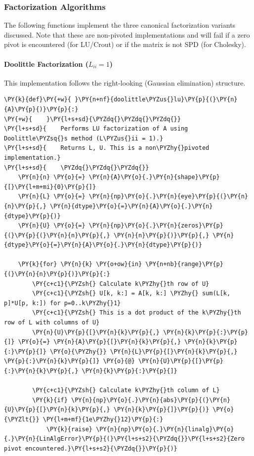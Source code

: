 \subsubsection*{Factorization Algorithms}
The following functions implement the three canonical factorization variants discussed. Note that these are non-pivoted implementations and will fail if a zero pivot is encountered (for LU/Crout) or if the matrix is not SPD (for Cholesky).

\paragraph{Doolittle Factorization ($L_{ii} = 1$)}
This implementation follows the right-looking (Gaussian elimination) structure.

\begin{Verbatim}[commandchars=\\\{\}]
\PY{k}{def}\PY{+w}{ }\PY{n+nf}{doolittle\PYZus{}lu}\PY{p}{(}\PY{n}{A}\PY{p}{)}\PY{p}{:}
\PY{+w}{    }\PY{l+s+sd}{\PYZdq{}\PYZdq{}\PYZdq{}}
\PY{l+s+sd}{    Performs LU factorization of A using Doolittle\PYZsq{}s method (L\PYZus{}ii = 1).}
\PY{l+s+sd}{    Returns L, U. This is a non\PYZhy{}pivoted implementation.}
\PY{l+s+sd}{    \PYZdq{}\PYZdq{}\PYZdq{}}
    \PY{n}{n} \PY{o}{=} \PY{n}{A}\PY{o}{.}\PY{n}{shape}\PY{p}{[}\PY{l+m+mi}{0}\PY{p}{]}
    \PY{n}{L} \PY{o}{=} \PY{n}{np}\PY{o}{.}\PY{n}{eye}\PY{p}{(}\PY{n}{n}\PY{p}{,} \PY{n}{dtype}\PY{o}{=}\PY{n}{A}\PY{o}{.}\PY{n}{dtype}\PY{p}{)}
    \PY{n}{U} \PY{o}{=} \PY{n}{np}\PY{o}{.}\PY{n}{zeros}\PY{p}{(}\PY{p}{(}\PY{n}{n}\PY{p}{,} \PY{n}{n}\PY{p}{)}\PY{p}{,} \PY{n}{dtype}\PY{o}{=}\PY{n}{A}\PY{o}{.}\PY{n}{dtype}\PY{p}{)}

    \PY{k}{for} \PY{n}{k} \PY{o+ow}{in} \PY{n+nb}{range}\PY{p}{(}\PY{n}{n}\PY{p}{)}\PY{p}{:}
        \PY{c+c1}{\PYZsh{} Calculate k\PYZhy{}th row of U}
        \PY{c+c1}{\PYZsh{} U[k, k:] = A[k, k:] \PYZhy{} sum(L[k, p]*U[p, k:]) for p=0..k\PYZhy{}1}
        \PY{c+c1}{\PYZsh{} This is a dot product of the k\PYZhy{}th row of L with columns of U}
        \PY{n}{U}\PY{p}{[}\PY{n}{k}\PY{p}{,} \PY{n}{k}\PY{p}{:}\PY{p}{]} \PY{o}{=} \PY{n}{A}\PY{p}{[}\PY{n}{k}\PY{p}{,} \PY{n}{k}\PY{p}{:}\PY{p}{]} \PY{o}{\PYZhy{}} \PY{n}{L}\PY{p}{[}\PY{n}{k}\PY{p}{,} \PY{p}{:}\PY{n}{k}\PY{p}{]} \PY{o}{@} \PY{n}{U}\PY{p}{[}\PY{p}{:}\PY{n}{k}\PY{p}{,} \PY{n}{k}\PY{p}{:}\PY{p}{]}

        \PY{c+c1}{\PYZsh{} Calculate k\PYZhy{}th column of L}
        \PY{k}{if} \PY{n}{np}\PY{o}{.}\PY{n}{abs}\PY{p}{(}\PY{n}{U}\PY{p}{[}\PY{n}{k}\PY{p}{,} \PY{n}{k}\PY{p}{]}\PY{p}{)} \PY{o}{\PYZlt{}} \PY{l+m+mf}{1e\PYZhy{}12}\PY{p}{:}
            \PY{k}{raise} \PY{n}{np}\PY{o}{.}\PY{n}{linalg}\PY{o}{.}\PY{n}{LinAlgError}\PY{p}{(}\PY{l+s+s2}{\PYZdq{}}\PY{l+s+s2}{Zero pivot encountered.}\PY{l+s+s2}{\PYZdq{}}\PY{p}{)}


\end{Verbatim}
